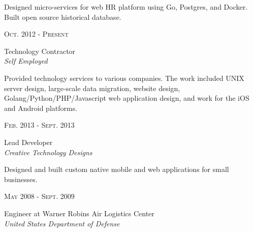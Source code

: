 \documentclass[10pt]{article} %
\begin{document}
{\begin{minipage}[t]{0.5\textwidth}
\small{Designed micro-services for web HR platform using Go, Postgres, and 
  Docker. Built open source historical database.}\\


{\raggedleft\textsc{Oct. 2012 - Present}\par}
{\raggedright\large Technology Contractor\\
\textit{Self Employed}\\[5pt]}

\small{Provided technology services to various companies. The work included 
  UNIX server design, large-scale data migration, website design, 
  Golang/Python/PHP/Javascript web application design, and work for the iOS 
  and Android platforms.}\\


{\raggedleft\textsc{Feb. 2013 - Sept. 2013}\par}
{\raggedright\large Lead Developer\\
\textit{Creative Technology Designs}\\[5pt]}


\small{Designed and built custom native mobile and web applications for small 
  businesses.}\\


{\raggedleft\textsc{May 2008 - Sept. 2009}\par}

{\raggedright\large Engineer at Warner Robins Air Logistics Center\\
\textit{United States Department of Defense}\\[5pt]}


\end{minipage}}
\end{document}
